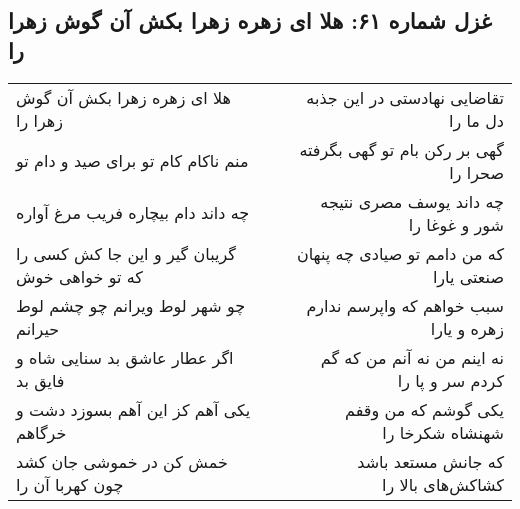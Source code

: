 \begin{center}
\section*{غزل شماره ۶۱: هلا ای زهره زهرا بکش آن گوش زهرا را}
\label{sec:0061}
\begin{longtable}{l p{0.5cm} r}
هلا ای زهره زهرا بکش آن گوش زهرا را
&&
تقاضایی نهادستی در این جذبه دل ما را
\\
منم ناکام کام تو برای صید و دام تو
&&
گهی بر رکن بام تو گهی بگرفته صحرا را
\\
چه داند دام بیچاره فریب مرغ آواره
&&
چه داند یوسف مصری نتیجه شور و غوغا را
\\
گریبان گیر و این جا کش کسی را که تو خواهی خوش
&&
که من دامم تو صیادی چه پنهان صنعتی یارا
\\
چو شهر لوط ویرانم چو چشم لوط حیرانم
&&
سبب خواهم که واپرسم ندارم زهره و یارا
\\
اگر عطار عاشق بد سنایی شاه و فایق بد
&&
نه اینم من نه آنم من که گم کردم سر و پا را
\\
یکی آهم کز این آهم بسوزد دشت و خرگاهم
&&
یکی گوشم که من وقفم شهنشاه شکرخا را
\\
خمش کن در خموشی جان کشد چون کهربا آن را
&&
که جانش مستعد باشد کشاکش‌های بالا را
\\
\end{longtable}
\end{center}
